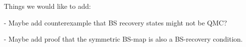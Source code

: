 Things we would like to add:

- Maybe add counterexample that BS recovery states might not be QMC?

- Maybe add proof that the symmetric BS-map is also a BS-recovery condition. 